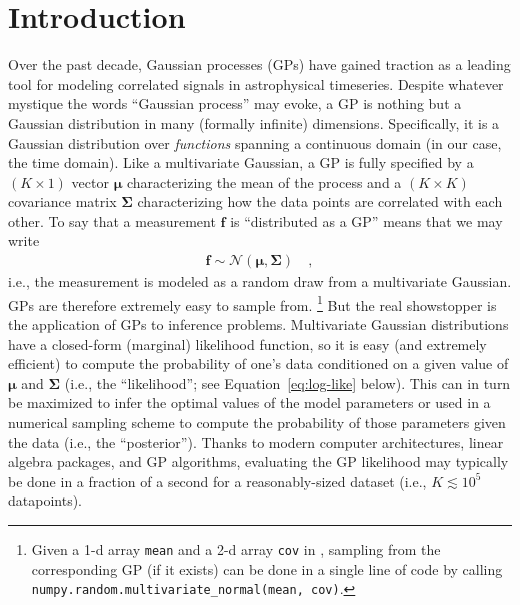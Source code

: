 \documentclass[modern]{aastex62}
\begin{document}
\section{Introduction}
\label{sec:intro}

Over the past decade, Gaussian processes (GPs) have gained traction as
a leading tool for modeling correlated signals in astrophysical timeseries.
Despite whatever mystique the words ``Gaussian process'' may evoke, a GP
is nothing but a Gaussian distribution in many (formally infinite)
dimensions. Specifically, it is a Gaussian distribution over
\emph{functions} spanning a continuous domain (in our case, the time domain).
Like a multivariate
Gaussian, a GP is fully specified by a $(K \times 1)$ vector $\pmb{\mu}$ characterizing
the mean of the process and a $(K \times K)$
covariance matrix $\pmb{\Sigma}$ characterizing how the data points
are correlated with each other. To say that a measurement $\mathbf{f}$ is
``distributed as a GP'' means that we may write
%
\begin{align}
    \mathbf{f} \sim \mathcal{N}\left( \pmb{\mu}, \pmb{\Sigma} \right)
    \quad,
\end{align}
%
i.e., the measurement is modeled as a random draw from a multivariate Gaussian.
GPs are therefore extremely easy to sample from.%
\footnote{Given a 1-d array \texttt{mean} and a 2-d array \texttt{cov} in \Python,
    sampling from the corresponding GP (if it exists)
    can be done in a single line of code by calling
    \texttt{numpy.random.multivariate\_normal(mean, cov)}.}
But the real showstopper is the application of GPs to inference problems.
Multivariate Gaussian distributions have a closed-form (marginal) likelihood
function, so it is easy (and extremely efficient) to compute the probability
of one's data conditioned on a given value of $\pmb{\mu}$ and $\pmb{\Sigma}$
(i.e., the ``likelihood''; see Equation~\ref{eq:log-like} below).
This can in turn be maximized
to infer the optimal values of the model parameters
or used in a
numerical sampling scheme to compute the probability of those parameters
given the data (i.e., the ``posterior'').
Thanks to modern computer architectures, linear algebra packages, and
GP algorithms,
evaluating the GP likelihood may typically be done in a fraction of a second
for a reasonably-sized dataset (i.e., $K \lesssim 10^5$ datapoints).
\end{document}
